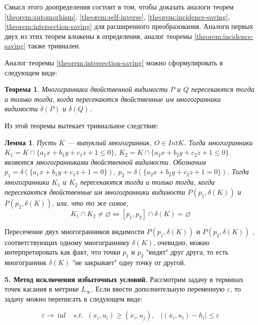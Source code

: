\documentclass[a4paper, 10pt]{article}
\theoremstyle{definition}
\theoremstyle{plain}
\newtheorem{SmartTheorem}{Теорема}
\theoremstyle{plain}
\newtheorem{SmartLemma}{Лемма}
\begin{document}
Смысл этого доопределения состоит в том, чтобы доказать аналоги теорем
\ref{theorem:automorhism}, \ref{theorem:self-inverse},
\ref{theorem:incidence-saving}, \ref{theorem:intersection-saving} для
расширенного преобразования. Аналоги первых двух из этих теорем вложены в
определения, аналог теоремы \ref{theorem:incidence-saving} также тривиален.

Аналог теоремы \ref{theorem:intersection-saving} можно сформулировать в
следующем виде:

\begin{SmartTheorem}
 Многогранники двойственной видимости $P$ и $Q$ пересекаются тогда и только
 тогда, когда пересекаются двойственные им многогранники видимости
 $\delta(P)$ и $\delta(Q)$.
\end{SmartTheorem}

Из этой теоремы вытекает тривиальное следствие:

\begin{SmartLemma}
\label{lemma:expanded-intersection-saving}
 Пусть $K$ --- выпуклый многогранник, $O \in Int K$. Тогда многогранники
 $K_{1} = K \cap \{a_1 x + b_1 y + c_1 z + 1 \leq 0\}$,
 $K_{2} = K \cap \{a_2 x + b_2 y + c_2 z + 1 \leq 0\}$.
 являются многогранниками двойственной видимости. Обозначим
 $p_1 = \delta(\{a_1 x + b_1 y + c_1 z + 1 = 0\})$,
 $p_2 = \delta(\{a_2 x + b_2 y + c_2 z + 1 = 0\})$.
 Тогда многогранники $K_{1}$ и $K_{2}$ пересекаются тогда и только тогда, когда
 пересекаются двойственные им многогранники видимости $P(p_1, \delta(K))$ и
 $P(p_2, \delta(K))$, или, что то же самое,
 \begin{equation*}
  K_{1} \cap K_{2} \neq \varnothing \Leftrightarrow
  [p_1, p_2] \cap \delta(K) = \varnothing
 \end{equation*}
\end{SmartLemma}

Пересечение двух многогранников видимости $P(p_1, \delta(K))$ и
$P(p_2, \delta(K))$ , соответствующих одному многограннику $\delta(K)$,
очевидно, можно интерпретировать как факт, что точки $p_1$ и $p_2$ "видят" друг
друга, то есть многогранник $\delta(K)$ "не закрывает" одну точку от другой.

\textbf{5. Метод исключения избыточных условий.} Рассмотрим задачу в терминах
точек касания в метрике $L_{\infty}$. Если ввести дополнительную переменную
$\varepsilon$, то задачу можно переписать в следующем виде:

\begin{equation}
\label{equation:infinity-problem}
 \varepsilon \to \inf \;\;\;
 s. t. \;\; (x_{i}, u_{i}) \geq (x_{i}, u_{j}), \;\;\;
 |(x_{i}, u_{i}) - h_{i}| \leq \varepsilon
\end{equation}
\end{document}
